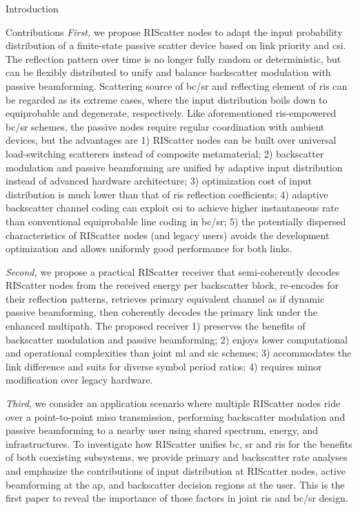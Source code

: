 \documentclass[journal]{IEEEtran}
\begin{document}
\begin{section}{Introduction}
\begin{subsection}{Contributions}
		\emph{First,} we propose RIScatter nodes to adapt the input probability distribution of a finite-state passive scatter device based on link priority and \gls{csi}.
		The reflection pattern over time is no longer fully random or deterministic, but can be flexibly distributed to unify and balance backscatter modulation with passive beamforming.
		Scattering source of \gls{bc}/\gls{sr} and reflecting element of \gls{ris} can be regarded as its extreme cases, where the input distribution boils down to equiprobable and degenerate, respectively.
		Like aforementioned \gls{ris}-empowered \gls{bc}/\gls{sr} schemes, the passive nodes require regular coordination with ambient devices, but the advantages are
		1) RIScatter nodes can be built over universal load-switching scatterers instead of composite metamaterial;
		2) backscatter modulation and passive beamforming are unified by adaptive input distribution instead of advanced hardware architecture;
		3) optimization cost of input distribution is much lower than that of \gls{ris} reflection coefficients;
		4) adaptive backscatter channel coding can exploit \gls{csi} to achieve higher instantaneous rate than conventional equiprobable line coding in \gls{bc}/\gls{sr};
		5) the potentially dispersed characteristics of RIScatter nodes (and legacy users) avoids the development optimization and allows uniformly good performance for both links.

		\emph{Second,} we propose a practical RIScatter receiver that semi-coherently decodes RIScatter nodes from the received energy per backscatter block, re-encodes for their reflection patterns, retrieves primary equivalent channel as if dynamic passive beamforming, then coherently decodes the primary link under the enhanced multipath.
		The proposed receiver
		1) preserves the benefits of backscatter modulation and passive beamforming;
		2) enjoys lower computational and operational complexities than joint \gls{ml} and \gls{sic} schemes;
		3) accommodates the link difference and suits for diverse symbol period ratios;
		4) requires minor modification over legacy hardware.

		\emph{Third,} we consider an application scenario where multiple RIScatter nodes ride over a point-to-point \gls{miso} transmission, performing backscatter modulation and passive beamforming to a nearby user using shared spectrum, energy, and infrastructures.
		To investigate how RIScatter unifies \gls{bc}, \gls{sr} and \gls{ris} for the benefits of both coexisting subsystems, we provide primary and backscatter rate analyses and emphasize the contributions of input distribution at RIScatter nodes, active beamforming at the \gls{ap}, and backscatter decision regions at the user.
		This is the first paper to reveal the importance of those factors in joint \gls{ris} and \gls{bc}/\gls{sr} design.


\end{subsection}
\end{section}
\end{document}
